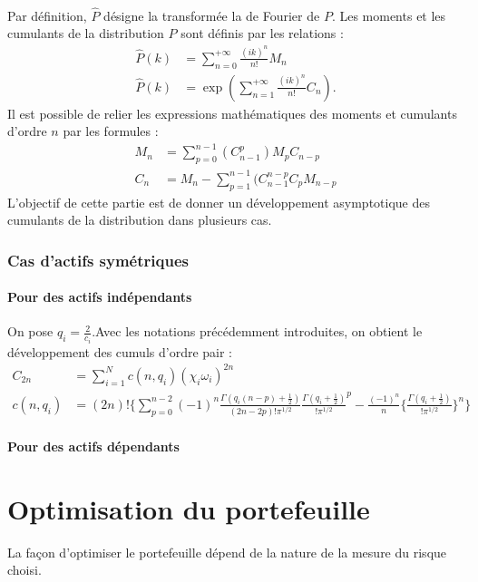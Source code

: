 \documentclass{article}
\begin{document}
\paragraph{}         
       Par définition, $ \widehat{P} $ désigne la transformée la de Fourier de $P$. Les moments et les cumulants de la distribution $P$ sont définis par les relations :
       \begin{align}
       \widehat{P}(k) &= \sum _{n=0}^{+\infty }\frac{(ik)^{n}}{n!}M_{n}\\
       \widehat{P}(k) &= \exp(\sum _{n=1}^{+\infty }\frac{(ik)^{n}}{n!}C_{n}).
       \end{align}
        Il est possible de relier les expressions mathématiques des moments et cumulants d'ordre $n$ par les formules :
    \begin{align}
    M_{n} &= \sum ^{n-1}_{p=0}(C^{p}_{n-1})M_{p}C_{n-p}\\
    C_{n} &= M_{n}-\sum ^{n-1}_{p=1}(C_{n-1}^{n-p}C_{p}M_{n-p}
    \end{align}
     L'objectif de cette partie est de donner un développement asymptotique des cumulants de la distribution dans plusieurs cas.
     \subsubsection{Cas d'actifs symétriques}
     \paragraph{Pour des actifs indépendants}
     On pose $ q_{i}=\frac{2}{c_{i}}$.Avec les notations précédemment introduites, on obtient le développement des cumuls d'ordre pair :
     \begin{align}
     C_{2n} &= \sum_{i=1}^{N}c(n,q_{i})(\chi _{i}\omega _{i})^{2n}\\
     c(n,q_{i}) &= (2n)!\lbrace \sum_{p=0}^{n-2}(-1)^{n}\frac{\Gamma (q_{i}(n-p)+\frac{1}{2})}{(2n-2p)!\pi ^{1/2}}{\frac{\Gamma (q_{i}+\frac{1}{2})}{!\pi ^{1/2}}}^{p}-\frac{(-1)^{n}}{n}\lbrace \frac{\Gamma (q_{i}+\frac{1}{2})}{!\pi ^{1/2}}\rbrace ^{n}\rbrace
     \end{align}
      \paragraph{Pour des actifs dépendants}
      \section{ Optimisation du portefeuille}
      La façon d'optimiser le portefeuille dépend de la nature de la mesure du risque choisi.
\end{document}
